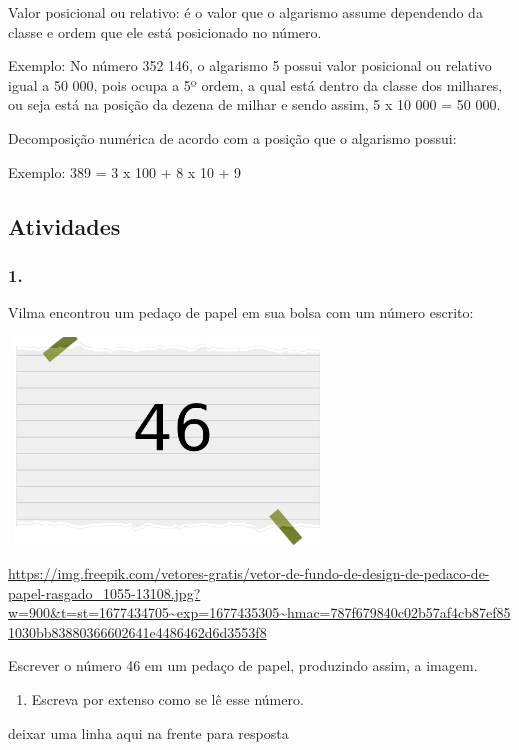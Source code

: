 Valor posicional ou relativo: é o valor que o algarismo assume
dependendo da classe e ordem que ele está posicionado no número.

Exemplo: No número 352 146, o algarismo 5 possui valor posicional ou
relativo igual a 50 000, pois ocupa a 5º ordem, a qual está dentro da
classe dos milhares, ou seja está na posição da dezena de milhar e sendo
assim, 5 x 10 000 = 50 000.

Decomposição numérica de acordo com a posição que o algarismo possui:

Exemplo: 389 = 3 x 100 + 8 x 10 + 9

\subsection{Atividades}\label{atividades}

\subsubsection{1. }\label{section}

Vilma encontrou um pedaço de papel em sua bolsa com um número escrito:

\includegraphics[width=3.30833in,height=2.17391in]{media/image2.png}

\url{https://img.freepik.com/vetores-gratis/vetor-de-fundo-de-design-de-pedaco-de-papel-rasgado_1055-13108.jpg?w=900\&t=st=1677434705~exp=1677435305~hmac=787f679840c02b57af4cb87ef851030bb83880366602641e4486462d6d3553f8}

Escrever o número 46 em um pedaço de papel, produzindo assim, a imagem.

\begin{enumerate}
\def\labelenumi{\alph{enumi})}
\item
  Escreva por extenso como se lê esse número.
\end{enumerate}

deixar uma linha aqui na frente para resposta

